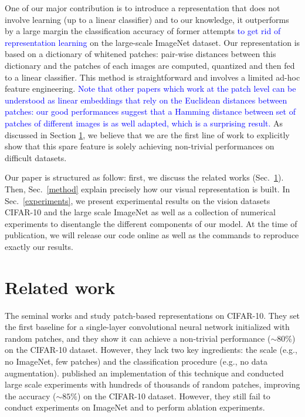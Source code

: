 \documentclass{article}
\newcommand{\Edouard}[1]{\textcolor{blue}{#1}}
\begin{document}
One of our major contribution is to introduce a   representation that does not involve learning (up to a linear classifier) and to our knowledge, it outperforms by a large margin the classification accuracy of former attempts \Edouard{to get rid of representation learning} on the large-scale ImageNet dataset. Our representation is based on a dictionary of whitened patches: pair-wise distances between this dictionary and the patches of each images are computed, quantized and then fed to a linear classifier. This method is  straightforward and involves a limited ad-hoc feature engineering. \Edouard{Note that other papers which work at the patch level can be understood as linear embeddings that rely on the Euclidean distances between patches: our good performances suggest that a Hamming distance between set of patches of different images is as well adapted, which is a surprising result.} As discussed in Section \ref{related_work}, we believe that we are the first line of work to explicitly show that this  spare feature is solely achieving non-trivial performances on difficult datasets.

Our paper is structured as follow: first, we discuss the related works (Sec.~\ref{related_work}). Then, Sec.~\ref{method} explain precisely how our visual representation is built. In Sec.~\ref{experiments}, we present experimental results on the vision datasets CIFAR-10 and the large scale  ImageNet as well as a collection of numerical experiments to disentangle the different components of our model. At the time of publication, we will release our code online as well as the commands to reproduce exactly our results.


\section{Related work}
\label{related_work}

The seminal works \cite{coates2011analysis} and \cite{coates2011importance}  study patch-based representations on CIFAR-10.
They set the first baseline for a single-layer convolutional neural network initialized with random patches, and they show it  can achieve a non-trivial performance ($\sim 80 \%$) on the CIFAR-10 dataset. However, they lack two key ingredients: the scale (e.g., no ImageNet, few patches) and the classification procedure (e.g., no data augmentation).
 \cite{recht2019imagenet} published an implementation of this technique and conducted large scale experiments with hundreds of thousands of random patches, improving the accuracy ($\sim 85 \%$) on the CIFAR-10 dataset.
However, they still fail to conduct experiments on ImageNet and to perform  ablation experiments.
\end{document}
